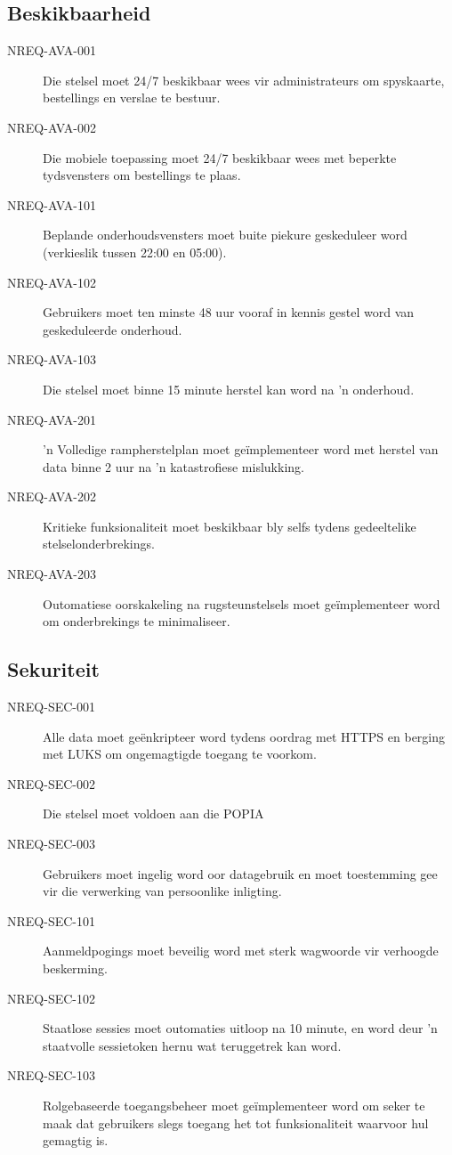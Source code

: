\subsection{Beskikbaarheid}
\begin{description}
  \item[NREQ-AVA-001] Die stelsel moet 24/7 beskikbaar wees vir administrateurs om spyskaarte, bestellings en verslae te bestuur.
  \item[NREQ-AVA-002] Die mobiele toepassing moet 24/7 beskikbaar wees met beperkte tydsvensters om bestellings te plaas.
  \item[NREQ-AVA-101] Beplande onderhoudsvensters moet buite piekure geskeduleer word (verkieslik tussen 22:00 en 05:00).
  \item[NREQ-AVA-102] Gebruikers moet ten minste 48 uur vooraf in kennis gestel word van geskeduleerde onderhoud.
  \item[NREQ-AVA-103] Die stelsel moet binne 15 minute herstel kan word na 'n onderhoud.
  \item[NREQ-AVA-201] 'n Volledige rampherstelplan moet geïmplementeer word met herstel van data binne 2 uur na 'n katastrofiese mislukking.
  \item[NREQ-AVA-202] Kritieke funksionaliteit moet beskikbaar bly selfs tydens gedeeltelike stelselonderbrekings.
  \item[NREQ-AVA-203] Outomatiese oorskakeling na rugsteunstelsels moet geïmplementeer word om onderbrekings te minimaliseer.
\end{description}

\subsection{Sekuriteit}
\begin{description}
  \item[NREQ-SEC-001] Alle data moet geënkripteer word tydens oordrag met \ac{HTTPS} 
  en berging met \ac{LUKS} om ongemagtigde toegang te voorkom.
  \item[NREQ-SEC-002] Die stelsel moet voldoen aan die \ac{POPIA}
  \item[NREQ-SEC-003] Gebruikers moet ingelig word oor datagebruik en moet toestemming gee vir die verwerking van persoonlike inligting.
  \item[NREQ-SEC-101] Aanmeldpogings moet beveilig word met sterk wagwoorde vir verhoogde beskerming.
  \item[NREQ-SEC-102] Staatlose sessies moet outomaties uitloop na 10 minute, en word deur 'n staatvolle sessietoken hernu wat teruggetrek kan word.
  \item[NREQ-SEC-103] Rolgebaseerde toegangsbeheer moet geïmplementeer word om seker te maak dat gebruikers slegs toegang het tot funksionaliteit waarvoor hul gemagtig is.
\end{description}

